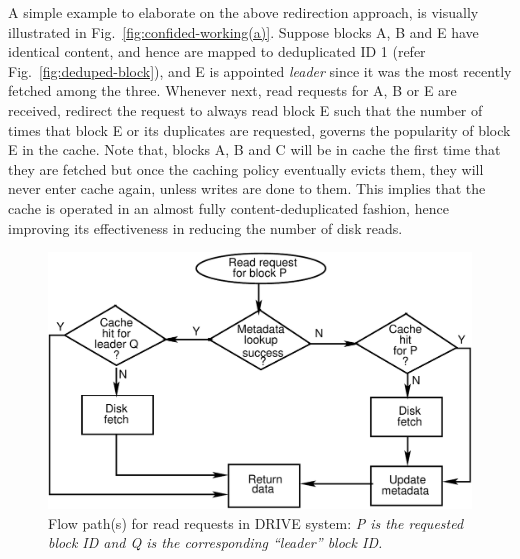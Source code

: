 A simple example to elaborate on the above redirection approach, is visually
illustrated in Fig.~\ref{fig:confided-working(a)}.
Suppose blocks A, B and E have identical content, and hence 
are mapped to deduplicated ID 1
(refer Fig.~\ref{fig:deduped-block}),
and E is appointed \textit{leader} since it was the most recently fetched
among the three.
Whenever next, read requests for A, B or E are received, redirect the request
to always read block E such that the number of times that block E or its
duplicates are requested, governs the popularity of block E in the cache.
Note that, blocks A, B and C will be in cache the first time that they 
are fetched but once the caching policy eventually evicts them, they
will never enter cache again, unless writes are done to them. This implies
that the cache is operated in an almost fully content-deduplicated fashion,
hence improving its effectiveness in reducing the number of disk reads.

\begin{figure}[t]
    \centering
    \includegraphics[scale=0.65]{confided-figures/main/dedup-working-readflowcomp.pdf}
    \caption{Flow path(s) for read requests in DRIVE system: \textit{P is the requested block ID and Q is the corresponding ``leader'' block ID.}}
    \label{fig:confided-working(b)}
\end{figure}

